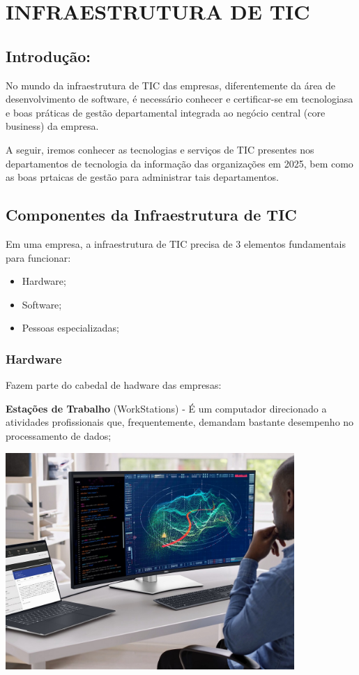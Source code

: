 \documentclass[
]{book}
\begin{document}
\chapter{INFRAESTRUTURA DE TIC}\label{infraestrutura-de-tic}

\section{Introdução:}\label{introduuxe7uxe3o-1}

No mundo da infraestrutura de TIC das empresas, diferentemente da área de desenvolvimento de software, é necessário conhecer e certificar-se em tecnologiasa e boas práticas de gestão departamental integrada ao negócio central (core business) da empresa.

A seguir, iremos conhecer as tecnologias e serviços de TIC presentes nos departamentos de tecnologia da informação das organizações em 2025, bem como as boas prtaicas de gestão para administrar tais departamentos.

\section{Componentes da Infraestrutura de TIC}\label{componentes-da-infraestrutura-de-tic}

Em uma empresa, a infraestrutura de TIC precisa de 3 elementos fundamentais para funcionar:

\begin{itemize}
\item
  Hardware;
\item
  Software;
\item
  Pessoas especializadas;
\end{itemize}

\subsection{Hardware}\label{hardware}

Fazem parte do cabedal de hadware das empresas:

\textbf{Estações de Trabalho} (WorkStations) - É um computador direcionado a atividades profissionais que, frequentemente, demandam bastante desempenho no processamento de dados;

\includegraphics[width=4.3125in,height=\textheight]{images/InfraEstrutura/hardware/01-estacao_de_trabalho.jpg}
\end{document}

